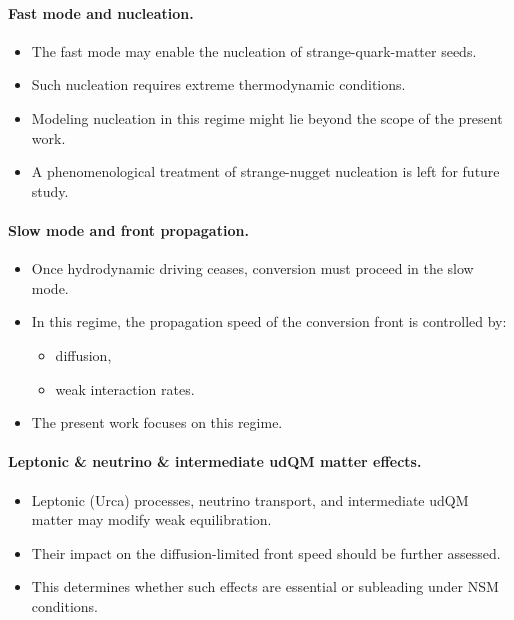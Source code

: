 \documentclass[12pt]{article}
\begin{document}
\paragraph{Fast mode and nucleation.}
\begin{itemize}
    \item The fast mode may enable the nucleation of strange-quark-matter seeds.
    \item Such nucleation requires extreme thermodynamic conditions.
    \item Modeling nucleation in this regime might lie beyond the scope of the present work.
    \item A phenomenological treatment of strange-nugget nucleation is left for future study.
\end{itemize}

\paragraph{Slow mode and front propagation.}
\begin{itemize}
    \item Once hydrodynamic driving ceases, conversion must proceed in the slow mode.
    \item In this regime, the propagation speed of the conversion front is controlled by:
    \begin{itemize}
        \item diffusion,
        \item weak interaction rates.
    \end{itemize}
    \item The present work focuses on this regime.
\end{itemize}

\paragraph{Leptonic \& neutrino \& intermediate udQM matter effects.}
\begin{itemize}
    \item Leptonic (Urca) processes, neutrino transport, and intermediate udQM matter may modify weak equilibration.
    \item Their impact on the diffusion-limited front speed should be further assessed.
    \item This determines whether such effects are essential or subleading under NSM conditions.
\end{itemize}
\end{document}
